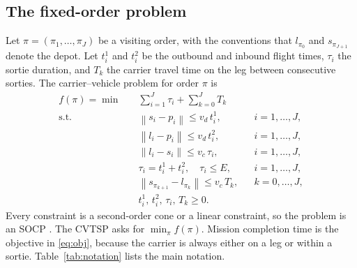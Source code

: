 \documentclass[preprint,12pt,authoryear]{elsarticle}
\newcommand{\norm}[1]{\left\lVert #1 \right\rVert}
\begin{document}
\subsection{The fixed-order problem}

Let $\pi = (\pi_{1},\dots,\pi_{J})$ be a visiting order, with the conventions that $l_{\pi_{0}}$ and $s_{\pi_{J+1}}$ denote the depot. Let $t^{1}_{i}$ and $t^{2}_{i}$ be the outbound and inbound flight times, $\tau_{i}$ the sortie duration, and $T_{k}$ the carrier travel time on the leg between consecutive sorties. The carrier--vehicle problem for order $\pi$ is
\begin{align}
f(\pi) = \min \quad & \sum_{i=1}^{J} \tau_{i} + \sum_{k=0}^{J} T_{k} \label{eq:obj} \\
\text{s.t.} \quad & \norm{s_{i} - p_{i}} \le v_{d}\, t^{1}_{i}, && i = 1,\dots,J, \label{eq:out}\\
& \norm{l_{i} - p_{i}} \le v_{d}\, t^{2}_{i}, && i = 1,\dots,J, \label{eq:in}\\
& \norm{l_{i} - s_{i}} \le v_{c}\, \tau_{i}, && i = 1,\dots,J, \label{eq:sync}\\
& \tau_{i} = t^{1}_{i} + t^{2}_{i}, \quad \tau_{i} \le E, && i = 1,\dots,J, \label{eq:end}\\
& \norm{s_{\pi_{k+1}} - l_{\pi_{k}}} \le v_{c}\, T_{k}, && k = 0,\dots,J, \label{eq:leg}\\
& t^{1}_{i},\, t^{2}_{i},\, \tau_{i},\, T_{k} \ge 0 . \label{eq:nonneg}
\end{align}
Every constraint is a second-order cone or a linear constraint, so the problem is an SOCP \citep{lobo1998}. The CVTSP asks for $\min_{\pi} f(\pi)$. Mission completion time is the objective in \eqref{eq:obj}, because the carrier is always either on a leg or within a sortie. Table~\ref{tab:notation} lists the main notation.
\end{document}
